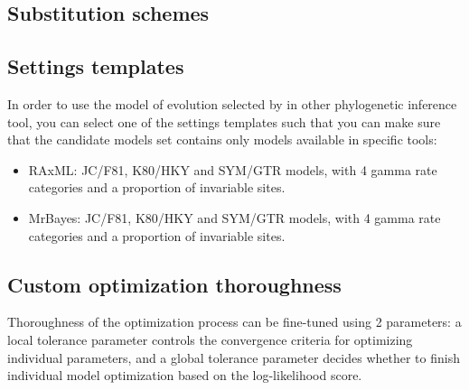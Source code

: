 \subsection{Substitution schemes}
\label{sec:arg:subschemes}

\subsection{Settings templates}
\label{sec:arg:templates}

In order to use the model of evolution selected by \modeltest in other phylogenetic inference tool,
you can select one of the settings templates such that you can make sure that the
candidate models set contains only models available in specific tools:

\begin{itemize}
  \item RAxML: JC/F81, K80/HKY and SYM/GTR models, with 4 gamma rate categories and a proportion of invariable sites.
  \item MrBayes: JC/F81, K80/HKY and SYM/GTR models, with 4 gamma rate categories and a proportion of invariable sites.
\end{itemize}

\subsection{Custom optimization thoroughness}
\label{sec:arg:thorough}

Thoroughness of the optimization process can be fine-tuned using 2 parameters:
a local tolerance parameter controls the convergence criteria for optimizing individual parameters,
and a global tolerance parameter decides whether to finish individual model optimization based on the log-likelihood score.
